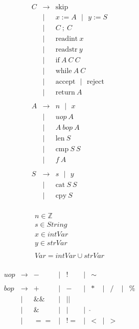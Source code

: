 \documentclass[a4paper,12pt]{article}
\newcommand{\OR}{\ \ \ |\ \ \ }
\begin{document}
\[ \begin{array}{lcl}
C & \rightarrow & \mbox{skip} \\
& | & x := A \OR y := S \\
& | & C\ ;\ C \\
& | & \mbox{readint}\ x \\
& | & \mbox{readstr}\ y \\
& | & \mbox{if}\ A\ C\ C\\
& | & \mbox{while}\ A\ C \\
& | & \mbox{accept} \OR \mbox{reject} \\
& | & \mbox{return}\ A \\
\\

A & \rightarrow & n \OR x \\
& | & uop\ A \\
& | & A\ bop\ A \\
& | & \mbox{len}\ S \\
& | & \mbox{cmp}\ S\ S \\
& | & f\ A \\
\\

S & \rightarrow & s \OR y \\
& | & \mbox{cat}\ S\ S \\
& | & \mbox{cpy}\ S \\

\end{array}\]

\[ \begin{array}{l}
n \in \mathbb{Z} \\
s \in String \\
x \in intVar \\
y \in strVar \\
\\
Var = intVar \cup strVar \\
\end{array}\]

\[ \begin{array}{lcccccccccc}

uop & \rightarrow & - &|& ! &|& \sim \\
\\

bop & \rightarrow & + &|& - &|& * &|& / &|& \% \\
& | & \&\& &|& || \\
& | & \& &|& | &|& \hat{} \\
& | & == &|& != &|& < &|& > \\
\\

\end{array}\]
\end{document}
